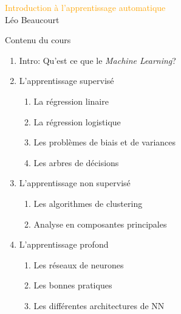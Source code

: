 \documentclass[11pt]{beamer}
\author{\textcolor{black}{Introduction à l'apprentissage automatique} \hfill \textcolor{orange}{Léo Beaucourt} \hfill \textcolor{black}{SIGMA - Agaetis}}
\begin{document}
\begin{frame}

  \vspace{5cm}
  \begin{center}
    \Large
    \textcolor{orange}{Introduction à l'apprentissage automatique}\\
    \normalsize
    \vspace{0.5cm}
    Léo Beaucourt
  \end{center}
    
\end{frame}


\begin{frame}{Contenu du cours}
  \begin{enumerate}
  \item Intro: Qu'est ce que le \textit{Machine Learning}?
  \item L'apprentissage supervisé
    \begin{enumerate}
    \item La régression linaire
    \item La régression logistique
    \item Les problèmes de biais et de variances
    \item Les arbres de décisions
    \end{enumerate}
  \item L'apprentissage non supervisé
    \begin{enumerate}
    \item Les algorithmes de clustering
    \item Analyse en composantes principales
    \end{enumerate}
  \item L'apprentissage profond
    \begin{enumerate}
    \item Les réseaux de neurones
    \item Les bonnes pratiques
    \item Les différentes architectures de NN
    \end{enumerate}
  \end{enumerate}
\end{frame}
\end{document}
